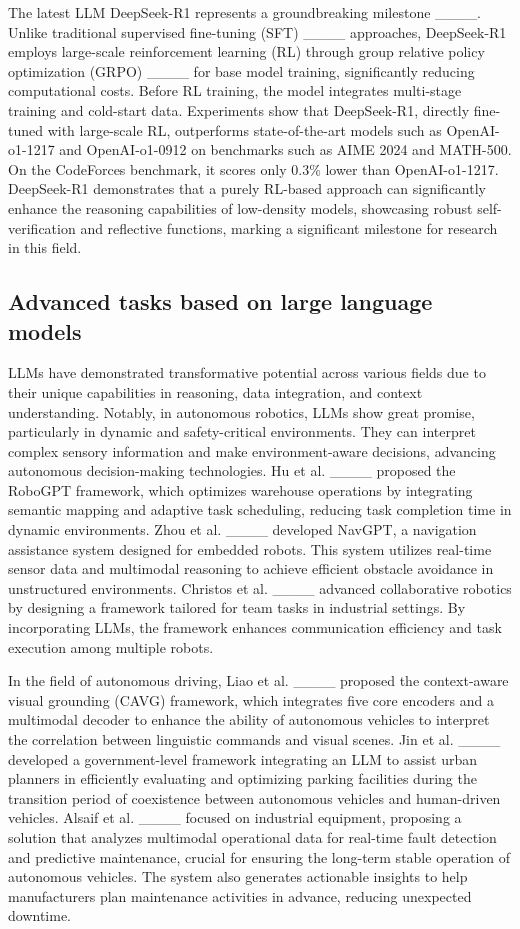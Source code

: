 The latest LLM DeepSeek-R1 represents a groundbreaking milestone ____. Unlike traditional supervised fine-tuning (SFT) ____ approaches, DeepSeek-R1 employs large-scale reinforcement learning (RL) through group relative policy optimization (GRPO) ____ for base model training, significantly reducing computational costs. Before RL training, the model integrates multi-stage training and cold-start data. Experiments show that DeepSeek-R1, directly fine-tuned with large-scale RL, outperforms state-of-the-art models such as OpenAI-o1-1217 and OpenAI-o1-0912 on benchmarks such as AIME 2024 and MATH-500. On the CodeForces benchmark, it scores only 0.3\% lower than OpenAI-o1-1217. DeepSeek-R1 demonstrates that a purely RL-based approach can significantly enhance the reasoning capabilities of low-density models, showcasing robust self-verification and reflective functions, marking a significant milestone for research in this field.

\subsection{Advanced tasks based on large language models}
LLMs have demonstrated transformative potential across various fields due to their unique capabilities in reasoning, data integration, and context understanding. Notably, in autonomous robotics, LLMs show great promise, particularly in dynamic and safety-critical environments. They can interpret complex sensory information and make environment-aware decisions, advancing autonomous decision-making technologies. Hu et al. ____ proposed the RoboGPT framework, which optimizes warehouse operations by integrating semantic mapping and adaptive task scheduling, reducing task completion time in dynamic environments. Zhou et al. ____ developed NavGPT, a navigation assistance system designed for embedded robots. This system utilizes real-time sensor data and multimodal reasoning to achieve efficient obstacle avoidance in unstructured environments. Christos et al. ____ advanced collaborative robotics by designing a framework tailored for team tasks in industrial settings. By incorporating LLMs, the framework enhances communication efficiency and task execution among multiple robots.

In the field of autonomous driving, Liao et al. ____ proposed the context-aware visual grounding (CAVG) framework, which integrates five core encoders and a multimodal decoder to enhance the ability of autonomous vehicles to interpret the correlation between linguistic commands and visual scenes. Jin et al. ____ developed a government-level framework integrating an LLM to assist urban planners in efficiently evaluating and optimizing parking facilities during the transition period of coexistence between autonomous vehicles and human-driven vehicles.  Alsaif et al. ____ focused on industrial equipment, proposing a solution that analyzes multimodal operational data for real-time fault detection and predictive maintenance, crucial for ensuring the long-term stable operation of autonomous vehicles. The system also generates actionable insights to help manufacturers plan maintenance activities in advance, reducing unexpected downtime. 

